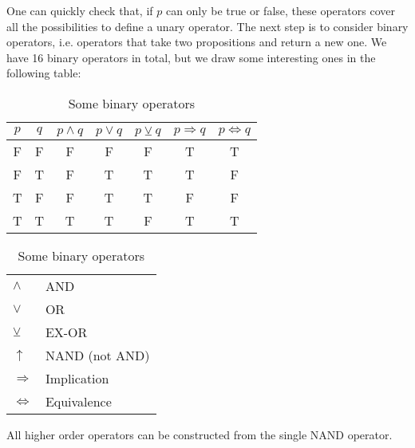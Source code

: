 \documentclass[root.tex]{subfiles}
\begin{document}
One can quickly check that, if $p$ can only be true or false, these operators cover all the possibilities to define a unary operator. The next step is to consider binary operators, i.e. operators that take two propositions and return a new one. We have 16 binary operators in total, but we draw some interesting ones in the following table:

    \begin{table}[h]
      \centering
      \begin{tabular}{c|c||c|c|c|c|c}
        $p$ & $q$ & $p\land q$ & $p\lor q$ & $p\veebar q$ & $p \Rightarrow q$ & $p \Leftrightarrow q$ \\
        \hline
          \rule{0pt}{12pt} F & F & F & F & F & T & T\\
                           F & T & F & T & T & T & F\\
                           T & F & F & T & T & F & F\\
                           T & T & T & T & F & T & T
      \end{tabular}\quad
      \begin{tabular}{ll}
        $\land$           & AND\\
        $\lor$            & OR\\
        $\veebar$         & EX-OR\\
        $\uparrow$        & NAND (not AND)\\
        $\Rightarrow$     & Implication\\
        $\Leftrightarrow$ & Equivalence
      \end{tabular}
      \caption{Some binary operators}
    \end{table}

\begin{remark}
  All higher order operators can be constructed from the single NAND operator.
\end{remark}
\end{document}

